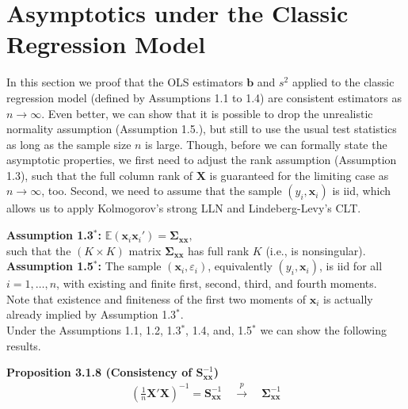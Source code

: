 \documentclass[
]{book}
\begin{document}
\hypertarget{asymptotics-under-the-classic-regression-model}{%
\section{Asymptotics under the Classic Regression Model}\label{asymptotics-under-the-classic-regression-model}}

In this section we proof that the OLS estimators \(\mathbf{b}\) and \(s^2\)
applied to the classic regression model (defined by Assumptions 1.1 to
1.4) are consistent estimators as \(n\to\infty\). Even better, we can show
that it is possible to drop the unrealistic normality assumption
(Assumption 1.5.), but still to use the usual test statistics as long as
the sample size \(n\) is large. Though, before we can formally state the
asymptotic properties, we first need to adjust the rank assumption
(Assumption 1.3), such that the full column rank of \(\mathbf{X}\) is guaranteed
for the limiting case as \(n\to\infty\), too. Second, we need to assume
that the sample \((y_i,\mathbf{x}_i)\) is iid, which allows us to apply
Kolmogorov's strong LLN and Lindeberg-Levy's CLT.

\textbf{Assumption 1.3\(^\ast\):}
\(\mathbb{E}(\mathbf{x}_i\mathbf{x}_i')=\boldsymbol{\Sigma}_{\mathbf{x}\mathbf{x}},\)\\
such that the \((K\times K)\) matrix \(\boldsymbol{\Sigma}_{\mathbf{x}\mathbf{x}}\) has
full rank \(K\) (i.e., is nonsingular).\\

\textbf{Assumption 1.5\(^\ast\):} The sample \((\mathbf{x}_i,\varepsilon_i)\), equivalently \((y_i,\mathbf{x}_i)\), is iid for all \(i=1,\dots,n\), with existing and finite first, second, third, and fourth moments.\\

Note that existence and finiteness of the first two moments of
\(\mathbf{x}_i\) is actually already implied by Assumption 1.3\(^\ast\).\\

Under the Assumptions 1.1, 1.2, 1.3\(^\ast\), 1.4, and, 1.5\(^\ast\) we can
show the following results.

\textbf{Proposition 3.1.8 (Consistency of \(\mathbf{S}_{\mathbf{x}\mathbf{x}}^{-1}\))}
\begin{align*}
\left( \frac{1}{n} \mathbf{X}'\mathbf{X} \right)^{-1} = \mathbf{S}_{\mathbf{x}\mathbf{x}}^{-1} \quad \overset{p} \longrightarrow \quad\boldsymbol{\Sigma}_{\mathbf{x}\mathbf{x}}^{-1}
\end{align*}
\end{document}
